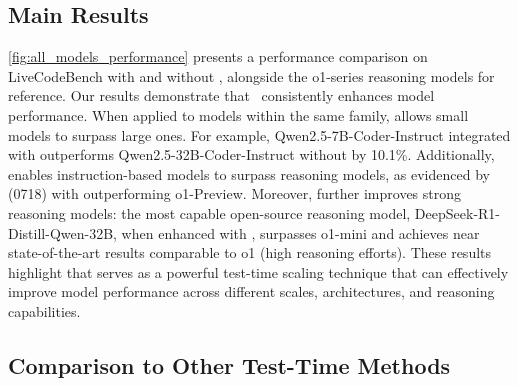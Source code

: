 \subsection{\frameworkname Main Results}
\label{sec:exp_main}
\cref{fig:all_models_performance} presents a performance comparison on LiveCodeBench with and without \frameworkname, alongside the o1-series reasoning models for reference. Our results demonstrate that \frameworkname~consistently enhances model performance. 
When applied to models within the same family, \frameworkname allows small models to surpass large ones. For example, Qwen2.5-7B-Coder-Instruct integrated with \frameworkname outperforms Qwen2.5-32B-Coder-Instruct without \frameworkname by 10.1\%. 
Additionally, \frameworkname enables instruction-based models to surpass reasoning models, as evidenced by \fouromini (0718) with \frameworkname outperforming o1-Preview. Moreover, \frameworkname further improves strong reasoning models: the most capable open-source reasoning model, DeepSeek-R1-Distill-Qwen-32B, when enhanced with \frameworkname, surpasses o1-mini and achieves near state-of-the-art results comparable to o1 (high reasoning efforts). These results highlight that \frameworkname serves as a powerful test-time scaling technique that can effectively improve model performance across different scales, architectures, and reasoning capabilities.

\subsection{Comparison to Other Test-Time Methods}
\label{sec:exp_compare_methods}

